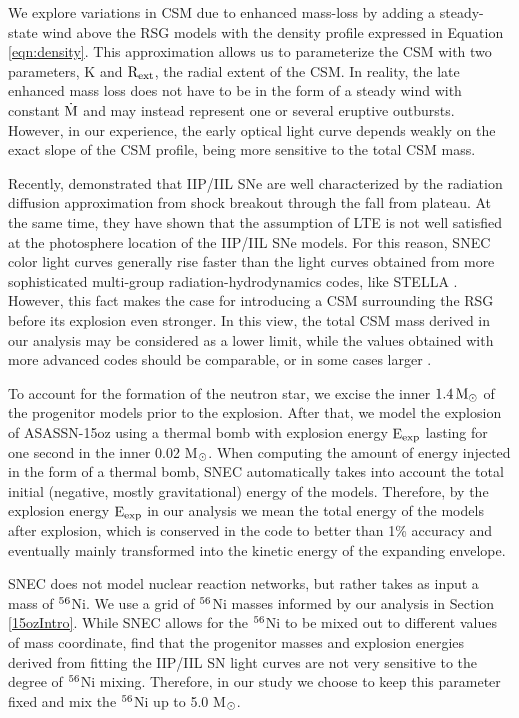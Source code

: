 \documentclass[a4paper,fleqn,usenatbib]{mnras}
\newcommand{\msunperiod}{M$\rm{_{\odot}}$}
\begin{document}
We explore variations in CSM due to enhanced mass-loss by adding a steady-state wind above the RSG models with the density profile expressed in Equation \ref{eqn:density}.
This approximation allows us to parameterize the CSM with two parameters, K and $\rm{R_{ext}}$, the radial extent of the CSM.
In reality, the late enhanced mass loss does not have to be in the form of a steady wind with constant $\rm{\dot{M}}$ and may instead represent one or several eruptive outbursts. However, in our experience, the early optical light curve depends weakly on the exact slope of the CSM profile, being more sensitive to the total CSM mass.

Recently, \citet{2018paxton} demonstrated that IIP/IIL SNe are well characterized by the radiation diffusion approximation from shock breakout through the fall from plateau.
At the same time, they have shown that the assumption of LTE is not well satisfied at the photosphere location of the IIP/IIL SNe models. 
For this reason, SNEC color light curves generally rise faster than the light curves obtained from more sophisticated multi-group radiation-hydrodynamics codes, like STELLA \citep{2018paxton}. 
However, this fact makes the case for introducing a CSM surrounding the RSG before its explosion even stronger.
In this view, the total CSM mass derived in our analysis may be considered as a lower limit, while the values obtained with more advanced codes should be comparable, or in some cases larger \citep{2017moriya,2018paxton}.

To account for the formation of the neutron star, we excise the inner $\rm{1.4\,M_{\odot}}$ of the progenitor models prior to the explosion. 
After that, we model the explosion of ASASSN-15oz using a thermal bomb with explosion energy $\rm{E_{exp}}$ lasting for one second in the inner 0.02 \msunperiod. 
When computing the amount of energy injected in the form of a thermal bomb, SNEC automatically takes into account the total initial (negative, mostly gravitational) energy of the models. 
Therefore, by the explosion energy $\rm{E_{exp}}$ in our analysis we mean the total energy of the models after explosion, which is conserved in the code to better than 1\% accuracy and eventually mainly transformed into the kinetic energy of the expanding envelope.

SNEC does not model nuclear reaction networks, but rather takes as input a mass of $\rm{{}^{56}}$Ni. 
We use a grid of $\rm{{}^{56}}$Ni masses informed by our analysis in Section \ref{15ozIntro}.
While SNEC allows for the $\rm{{}^{56}}$Ni to be mixed out to different values of mass coordinate, \citet{2017morozova} find that the progenitor masses and explosion energies derived from fitting the IIP/IIL SN light curves are not very sensitive to the degree of $\rm{{}^{56}}$Ni mixing.
Therefore, in our study we choose to keep this parameter fixed and mix the $\rm{{}^{56}}$Ni up to 5.0 M$\rm{_{\odot}}$.
\end{document}
